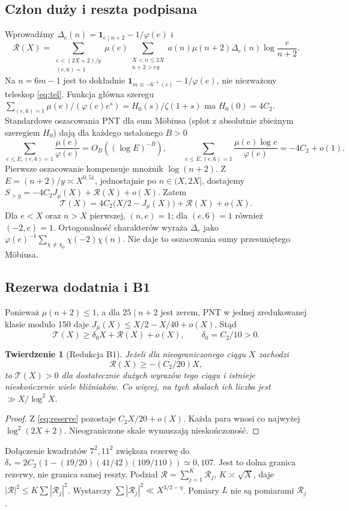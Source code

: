 \documentclass[11pt,a4paper]{article}
\newtheorem{tw}{Twierdzenie}[section]
\theoremstyle{definition}\newtheorem{defn}[tw]{Definicja}
\theoremstyle{remark}\newtheorem*{uw}{Uwaga}
\newcommand{\R}{\mathcal R}
\newcommand{\T}{\mathcal T}
\newcommand{\one}{\mathbf1}
\begin{document}
\subsection{Człon duży i reszta podpisana}
Wprowadźmy $\Delta_e(n)=\one_{e\mid n+2}-1/\varphi(e)$ i
\begin{equation}\label{eq:R}
 \R(X)=\sum_{\substack{e<(2X+2)/y\\(e,6)=1}}\mu(e)
 \sum_{\substack{X<n\le2X\\n+2>ey}}a(n)\mu(n+2)\Delta_e(n)
       \log\frac e{n+2}.
\end{equation}
Na $n=6m-1$ jest to dokładnie $\one_{m\equiv-6^{-1}\ (e)}-1/\varphi(e)$,
nie niezważony teleskop \eqref{eq:tel}. Funkcja główna szeregu
$\sum_{(e,6)=1}\mu(e)/(\varphi(e)e^s)=H_0(s)/\zeta(1+s)$ ma
$H_0(0)=4C_2$. Standardowe oszacowania PNT dla sum Möbiusa (splot z
absolutnie zbieżnym szeregiem $H_0$) dają dla każdego ustalonego $B>0$
\[
 \sum_{e\le E,(e,6)=1}\frac{\mu(e)}{\varphi(e)}=O_B((\log E)^{-B}),\qquad
 \sum_{e\le E,(e,6)=1}\frac{\mu(e)\log e}{\varphi(e)}=-4C_2+o(1).
\]
Pierwsze oszacowanie kompensuje mnożnik $\log(n+2)$. Z $E=(n+2)/y\asymp
X^{0{,}51}$, jednostajnie po $n\in(X,2X]$, dostajemy
$S_{>y}=-4C_2J_\mu(X)+\R(X)+o(X)$. Zatem
\begin{equation}\label{eq:B1exact}
 \boxed{\T(X)=4C_2\bigl(X/2-J_\mu(X)\bigr)+\R(X)+o(X).}
\end{equation}
Dla $e<X$ oraz $n>X$ pierwszej, $(n,e)=1$; dla $(e,6)=1$ również $(-2,e)=1$.
Ortogonalność charakterów wyraża $\Delta_e$ jako
$\varphi(e)^{-1}\sum_{\chi\ne\chi_0}\overline{\chi(-2)}\chi(n)$.
Nie daje to oszacowania sumy przesuniętego Möbiusa.

\subsection{Rezerwa dodatnia i B1}
Ponieważ $\mu(n+2)\le1$, a dla $25\mid n+2$ jest zerem, PNT w jednej
zredukowanej klasie modulo 150 daje
$J_\mu(X)\le X/2-X/40+o(X)$. Stąd
\begin{equation}\label{eq:reserve}
 \T(X)\ge\delta_0 X+\R(X)+o(X),\qquad\delta_0=C_2/10>0.
\end{equation}
\begin{tw}[Redukcja B1]\label{th:B1}
Jeżeli dla nieograniczonego ciągu $X$ zachodzi
\[
 \boxed{\R(X)\ge-(C_2/20)X,}
\]
to $\T(X)>0$ dla dostatecznie dużych wyrazów tego ciągu i istnieje
nieskończenie wiele bliźniaków. Co więcej, na tych skalach ich liczba jest
$\gg X/\log^2 X$.
\end{tw}
\begin{proof} Z \eqref{eq:reserve} pozostaje $C_2X/20+o(X)$. Każda para
wnosi co najwyżej $\log^2(2X+2)$. Nieograniczone skale wymuszają nieskończoność.
\end{proof}
Dołączenie kwadratów $7^2,11^2$ zwiększa rezerwę do
$\delta_*=2C_2(1-(19/20)(41/42)(109/110))\simeq0{,}107$.
Jest to dolna granica rezerwy, nie granica samej reszty.
Podział $\R=\sum_{j=1}^K\R_j$, $K\asymp\sqrt X$, daje
$|\R|^2\le K\sum|\R_j|^2$. Wystarczy $\sum|\R_j|^2\ll X^{3/2-\eta}$.
Pomiary $L$ nie są pomiarami $\R_j$.
\end{document}

